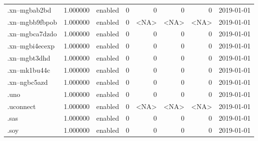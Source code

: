 \begin{tabular}{lrlrrrrl}
.xn--mgbab2bd             &          1.000000 &         enabled &                           0 &                           0 &                           0 &                   0 &           2019-01-01 \\
.xn--mgbb9fbpob           &          1.000000 &         enabled &                           0 &                        <NA> &                        <NA> &                <NA> &           2019-01-01 \\
.xn--mgbca7dzdo           &          1.000000 &         enabled &                           0 &                           0 &                           0 &                   0 &           2019-01-01 \\
.xn--mgbi4ecexp           &          1.000000 &         enabled &                           0 &                           0 &                           0 &                   0 &           2019-01-01 \\
.xn--mgbt3dhd             &          1.000000 &         enabled &                           0 &                           0 &                           0 &                   0 &           2019-01-01 \\
.xn--mk1bu44c             &          1.000000 &         enabled &                           0 &                           0 &                           0 &                   0 &           2019-01-01 \\
.xn--ngbc5azd             &          1.000000 &         enabled &                           0 &                           0 &                           0 &                   0 &           2019-01-01 \\
.uno                      &          1.000000 &         enabled &                           0 &                           0 &                           0 &                   0 &           2019-01-01 \\
.uconnect                 &          1.000000 &         enabled &                           0 &                        <NA> &                        <NA> &                <NA> &           2019-01-01 \\
.sas                      &          1.000000 &         enabled &                           0 &                           0 &                           0 &                   0 &           2019-01-01 \\
.soy                      &          1.000000 &         enabled &                           0 &                           0 &                           0 &                   0 &           2019-01-01 \\

\end{tabular}
